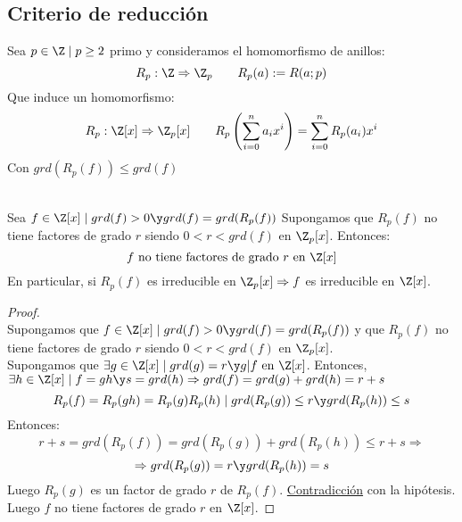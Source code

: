 \subsection{Criterio de reducción}

Sea $p \in \Z \mid p\geq 2$ primo y consideramos el homomorfismo de anillos:
$$R_p:\Z\Rightarrow \Z_p~~~~~~R_p(a):=R(a;p)$$
Que induce un homomorfismo:
$$R_p:\Z[x]\Rightarrow \Z_p[x]~~~~~~R_p\left(\sum_{i=0}^n a_i x^i \right) = \sum_{i=0}^n R_p(a_i)x^i$$
Con $grd(R_p(f)) \leq grd(f)$

\begin{prop}
    \ \\
    Sea $f \in \Z[x] \mid grd(f)>0 \y grd(f)=grd(R_p(f))$\newline
    Supongamos que $R_p(f)$ no tiene factores de grado $r$ siendo $0<r<grd(f)$ en $\Z_p[x]$. Entonces:
    $$f \mbox{ no tiene factores de grado } r \mbox{ en } \Z[x]$$
    En particular, si $R_p(f)$ es irreducible en $\Z_p[x] \Rightarrow f$ es irreducible en $\Z[x]$.
\begin{proof}
    \ \\
    Supongamos que $f \in \Z[x] \mid grd(f)>0 \y grd(f)=grd(R_p(f))$ y que $R_p(f)$ no tiene factores de grado
    $r$ siendo $0<r<grd(f)$ en $\Z_p[x]$.\\

    
    Supongamos que $\exists g \in \Z[x] \mid grd(g)=r \y g|f \mbox{ en } \Z[x]$.\newline
    Entonces, $\exists h \in \Z[x] \mid f=gh \y s=grd(h) \Rightarrow grd(f)=grd(g)+grd(h)=r+s$
    $$R_p(f)=R_p(gh)=R_p(g)R_p(h) \mid grd(R_p(g))\leq r \y grd(R_p(h))\leq s$$ Entonces:
    $$r+s = grd(R_p(f)) = grd(R_p(g))+grd(R_p(h)) \leq r+s \Rightarrow$$
    $$\Rightarrow grd(R_p(g))=r \y grd(R_p(h))=s$$
    Luego $R_p(g)$ es un factor de grado $r$ de $R_p(f)$. \underline{Contradicción} con la hipótesis.\\

    
    Luego $f$ no tiene factores de grado $r$ en $\Z[x]$.
\end{proof}
\end{prop}



